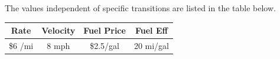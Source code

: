 The values independent of specific transitions are listed in the table below.
\begin{center}
\begin{tabular}{|cccc|}
\hline
Rate  & Velocity & Fuel Price & Fuel Eff   \\
\hline
\$6 /mi & 8 mph & \$2.5/gal & 20 mi/gal \\
\hline
\end{tabular}
\end{center}

